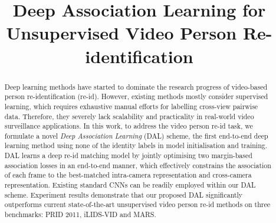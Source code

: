 \documentclass{bmvc2k}
\title{
{\titlesize Deep Association Learning for Unsupervised Video Person Re-identification}
}
\begin{document}
\maketitle
\begin{abstract}
Deep learning methods have started to dominate the
research progress of video-based person re-identification
(re-id). However, existing methods mostly consider supervised learning, which
requires exhaustive manual efforts for labelling cross-view pairwise
data. Therefore, they severely lack scalability and practicality in real-world
video surveillance applications.  
In this work, to address the
video person re-id task, we formulate a novel {\em Deep Association Learning}
(DAL) scheme, the first end-to-end deep learning method 
using none of the identity labels in model initialisation and training. 
DAL learns a deep re-id matching model by jointly optimising two
margin-based association losses in an end-to-end manner, 
which effectively constrains the association of each frame to the best-matched 
intra-camera representation and cross-camera representation.
Existing standard CNNs can be readily employed within our DAL scheme.
Experiment results demonstrate that our proposed DAL significantly outperforms current state-of-the-art
unsupervised video person re-id methods on three benchmarks: PRID 2011, iLIDS-VID and MARS.
\end{abstract}
\end{document}
